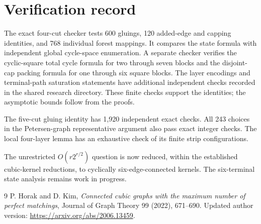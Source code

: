 \documentclass[11pt]{article}
\begin{document}
\clearpage
\tableofcontents

















\section{Verification record}
The exact four-cut checker tests 600 gluings, 120 added-edge and capping identities, and 768 individual forest mappings.
It compares the state formula with independent global cycle-space enumeration.
A separate checker verifies the cyclic-square total cycle formula for two through seven blocks and the disjoint-cap packing formula for one through six square blocks.
The layer encodings and terminal-path saturation statements have additional independent checks recorded in the shared research directory.
These finite checks support the identities; the asymptotic bounds follow from the proofs.

The five-cut gluing identity has 1,920 independent exact checks.
All 243 choices in the Petersen-graph representative argument also pass exact integer checks.
The local four-layer lemma has an exhaustive check of its finite strip configurations.

The unrestricted $O(r2^{r/2})$ question is now reduced, within the established cubic-kernel reductions, to cyclically six-edge-connected kernels.
The six-terminal state analysis remains work in progress.
\begin{thebibliography}{9}
 P. Horak and D. Kim, \emph{Connected cubic graphs with the maximum number of perfect matchings}, Journal of Graph Theory 99 (2022), 671--690. Updated author version: \url{https://arxiv.org/abs/2006.13459}.
\end{thebibliography}
\end{document}
